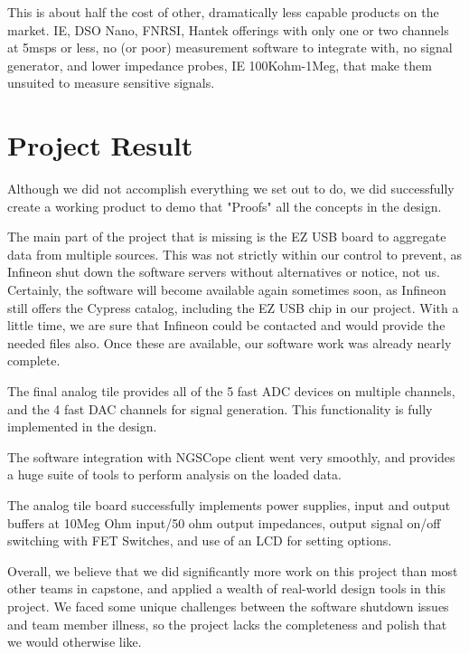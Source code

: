 This is about half the cost of other, dramatically less capable products on the market. IE, DSO Nano, FNRSI, Hantek offerings with only one or two channels at 5msps or less, no (or poor) measurement software to integrate with, no signal generator, and lower impedance probes, IE 100Kohm-1Meg, that make them unsuited to measure sensitive signals.

\section{Project Result}
Although we did not accomplish everything we set out to do, we did successfully create a working product to demo that "Proofs" all the concepts in the design.

The main part of the project that is missing is the EZ USB board to aggregate data from multiple sources. This was not strictly within our control to prevent, as Infineon shut down the software servers without alternatives or notice, not us. Certainly, the software will become available again sometimes soon, as Infineon still offers the Cypress catalog, including the EZ USB chip in our project. With a little time, we are sure that Infineon could be contacted and would provide the needed files also. Once these are available, our software work was already nearly complete.

The final analog tile provides all of the 5 fast ADC devices on multiple channels, and the 4 fast DAC channels for signal generation. This functionality is fully implemented in the design.

The software integration with NGSCope client went very smoothly, and provides a huge suite of tools to perform analysis on the loaded data.

The analog tile board successfully implements power supplies, input and output buffers at 10Meg Ohm input/50 ohm output impedances, output signal on/off switching with FET Switches, and use of an LCD for setting options.

Overall, we believe that we did significantly more work on this project than most other teams in capstone, and applied a wealth of real-world design tools in this project. We faced some unique challenges between the software shutdown issues and team member illness, so the project lacks the completeness and polish that we would otherwise like.